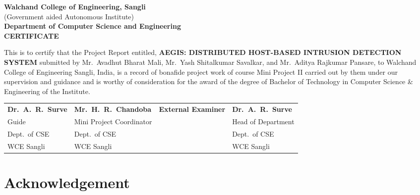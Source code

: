 \documentclass[12pt,a4paper]{report}
\begin{document}
\begin{center}
  {\large\bfseries Walchand College of Engineering, Sangli}\\
  {\normalsize (Government aided Autonomous Institute)}\\[6pt]
  {\large\bfseries Department of Computer Science and Engineering}\\[16pt]
  {\LARGE\bfseries\color{blue} CERTIFICATE}
\end{center}

\vspace{10pt}

This is to certify that the Project Report entitled, \textbf{AEGIS: DISTRIBUTED HOST-BASED INTRUSION DETECTION SYSTEM} submitted by Mr.\ Avadhut Bharat Mali, Mr.\ Yash Shitalkumar Savalkar, and Mr.\ Aditya Rajkumar Pansare, to Walchand College of Engineering Sangli, India, is a record of bonafide project work of course Mini Project II carried out by them under our supervision and guidance and is worthy of consideration for the award of the degree of Bachelor of Technology in Computer Science \& Engineering of the Institute.

\vspace{200pt}

\begin{center}
\begin{tabular}{p{3.5cm} p{4.5cm} p{3.5cm} p{3.5cm}}

\centering \textbf{Dr.\ A.\ R.\ Surve} &
\centering \textbf{Mr.\ H.\ R.\ Chandoba} &
\centering \textbf{External Examiner} &
\centering \textbf{Dr.\ A.\ R.\ Surve} \tabularnewline[6pt]

\centering Guide &
\centering Mini Project Coordinator &
&
\centering Head of Department \tabularnewline[10pt]

\centering Dept.\ of CSE &
\centering Dept.\ of CSE &
&
\centering Dept.\ of CSE \tabularnewline

\centering WCE Sangli &
\centering WCE Sangli &
&
\centering WCE Sangli

\end{tabular}
\end{center}
\chapter*{Acknowledgement}
\end{document}
